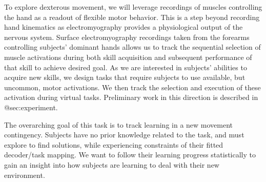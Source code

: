 \documentclass[../main.tex]{subfiles}
\begin{document}
To explore dexterous movement, we will leverage recordings of muscles controlling the hand as a readout of flexible motor behavior. This is a step beyond recording hand kinematics as electromyography provides a physiological output of the nervous system. Surface electromyography recordings taken from the forearms controlling subjects' dominant hands allows us to track the sequential selection of muscle activations during both skill acquisition and subsequent performance of that skill to achieve desired goal. As we are interested in subjects' abilities to acquire new skills, we design tasks that require subjects to use available, but uncommon, motor activations. We then track the selection and execution of these activation during virtual tasks. Preliminary work in this direction is described in {@sec:experiment}.

The overarching goal of this task is to track learning in a new movement contingency. Subjects have no prior knowledge related to the task, and must explore to find solutions, while experiencing constraints of their fitted decoder/task mapping. We want to follow their learning progress statistically to gain an insight into how subjects are learning to deal with their new environment.



\end{document}
